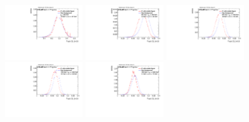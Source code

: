 \begin{figure}
\includegraphics[width=0.3\textwidth]{sascha_input/Appendix/Distributions/higgs/distributions/beta05/h_normal_tj_C2_05_bin1.pdf} 	\hspace{1mm}
\includegraphics[width=0.3\textwidth]{sascha_input/Appendix/Distributions/higgs/distributions/beta05/h_normal_tj_C2_05_bin2.pdf} 	\hspace{4mm}
\includegraphics[width=0.3\textwidth]{sascha_input/Appendix/Distributions/higgs/distributions/beta05/h_normal_tj_C2_05_bin3.pdf} 
\bigskip
\includegraphics[width=0.3\textwidth]{sascha_input/Appendix/Distributions/higgs/distributions/beta05/h_normal_tj_C2_05_bin4.pdf} 	\hspace{4mm}
\includegraphics[width=0.3\textwidth]{sascha_input/Appendix/Distributions/higgs/distributions/beta05/h_normal_tj_C2_05_bin5.pdf} 


\end{figure}
